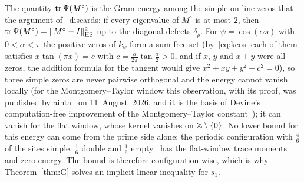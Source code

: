 The quantity $\operatorname{tr}\Psi(M^\circ)$ is the Gram energy among the simple on-line zeros that the argument of~\cite{AF} discards: if every eigenvalue
of $M^\circ$ is at most $2$, then $\operatorname{tr}\Psi(M^\circ)=\lVert M^\circ-I\rVert_{\mathrm{HS}}^2$ up to the diagonal defects $\delta_\rho$. For $\psi=\cos(\alpha s)$ with
$0<\alpha<\pi$ the positive zeros of $k_\psi$ form a sum-free set (by~\eqref{eq:kcos} each of them satisfies $x\tan(\pi x)=c$ with
$c=\frac\alpha{2\pi}\tan\frac\alpha2>0$, and if $x$, $y$ and $x+y$ were all zeros, the addition formula for the tangent would give
$x^2+xy+y^2+c^2=0$), so three simple zeros are never pairwise orthogonal and the energy cannot
vanish locally (for the Montgomery--Taylor window this observation, with its proof, was published by \mbox{ainta}~\cite{ainta} on
11~August~2026, and it is the basis of Devine's computation-free improvement of the Montgomery--Taylor constant~\cite{Devine22287432}); it can vanish for the flat window, whose kernel vanishes on $\mathbb Z\setminus\{0\}$. No lower bound for this energy can come from the
prime side alone: the periodic configuration with $\frac46$ of the sites simple, $\frac16$ double and $\frac16$ empty~\cite[\S7.2]{AF} has the
flat-window trace moments and zero energy. The bound is therefore configuration-wise, which is why Theorem~\ref{thm:G} solves an implicit
linear inequality for $s_1$.

